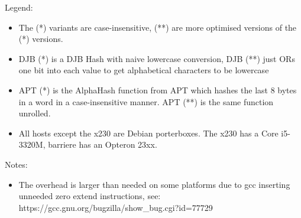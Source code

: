 \documentclass[parskip=half]{scrartcl}
\begin{document}
Legend:

\begin{itemize}
\item
  The (*) variants are case-insensitive, (**) are more optimised
  versions of the (*) versions.
\item
  DJB (*) is a DJB Hash with naive lowercase conversion, DJB (**) just
  ORs one bit into each value to get alphabetical characters to be
  lowercase
\item
  APT (*) is the AlphaHash function from APT which hashes the last 8
  bytes in a word in a case-insensitive manner. APT (**) is the same
  function unrolled.
\item
  All hosts except the x230 are Debian porterboxes. The x230 has a Core
  i5-3320M, barriere has an Opteron 23xx.
\end{itemize}
Notes:

\begin{itemize}
\item
  The overhead is larger than needed on some platforms due to gcc
  inserting unneeded zero extend instructions, see:
  https://gcc.gnu.org/bugzilla/show\_bug.cgi?id=77729
\end{itemize}

    
\end{document}
